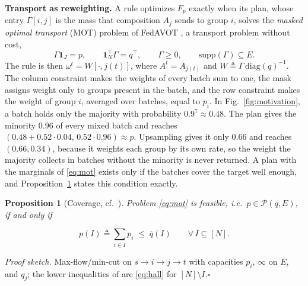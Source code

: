 \documentclass{article}
\newtheorem{proposition}[theorem]{Proposition}
\theoremstyle{definition}
\newcommand{\Nn}[1]{[#1]}
\newcommand{\Reach}{\mathcal{P}(q,E)}
\begin{document}
\noindent\textbf{Transport as reweighting.} A rule optimizes $F_p$ exactly
when its plan, whose entry $\Gamma[i,j]$ is the mass that composition
$A_j$ sends to group $i$, solves the \emph{masked optimal transport} (MOT)
problem of \textsf{FedAVOT} \cite{rahimi2025fedavot}, a transport problem
\cite{villani2009,peyre2019} without cost,
\begin{equation}
\Gamma\mathbf 1_J=p,\qquad \mathbf 1_N^\top\Gamma=q^\top,\qquad \Gamma\ge 0,
\qquad \mathrm{supp}(\Gamma)\subseteq E .
\label{eq:mot}
\end{equation}
The rule is then $\omega^t=W[\cdot,j(t)]$, where $A^t=A_{j(t)}$ and
$W\triangleq\Gamma\,\mathrm{diag}(q)^{-1}$. The column constraint makes the
weights of every batch sum to one, the mask assigns weight only to groups
present in the batch, and the row constraint makes the weight of group
$i$, averaged over batches, equal to $p_i$. In Fig.~\ref{fig:motivation},
a batch holds only the majority with probability $0.9^7\approx0.48$. The
plan gives the minority $0.96$ of every mixed batch and reaches
$(0.48+0.52\cdot0.04,\,0.52\cdot0.96)\approx p$. Upsampling gives it only
$0.66$ and reaches $(0.66,0.34)$, because it weights each group by its own
rate, so the weight the majority collects in batches without the minority
is never returned. A plan with the marginals of \eqref{eq:mot} exists only
if the batches cover the target well enough, and
Proposition~\ref{thm:feas} states this condition exactly.


\vspace{-6pt}
\begin{proposition}[Coverage, cf.\ {\cite[Thm.~1]{rahimi2025fedavot}}]
\label{thm:feas}
Problem \eqref{eq:mot} is feasible, i.e.\ $p\in\Reach$, if and only if
\vspace{-9pt}

\begin{equation}
\textstyle p(I)\triangleq\sum_{i\in I}p_i\;\le\;\bar q(I)
\qquad\forall\,I\subseteq\Nn{N}.
\label{eq:hall}
\end{equation}
\end{proposition}
\vspace{-6pt}
\noindent\emph{Proof sketch.} Max-flow/min-cut
\cite{hall1935,fordfulkerson1956} on $s\to i\to j\to t$ with capacities
$p_i$, $\infty$ on $E$, and $q_j$; the lower inequalities of
\cite[Thm.~1]{rahimi2025fedavot} are \eqref{eq:hall} for
$\Nn{N}\setminus I$.\hfill$\square$
\end{document}
